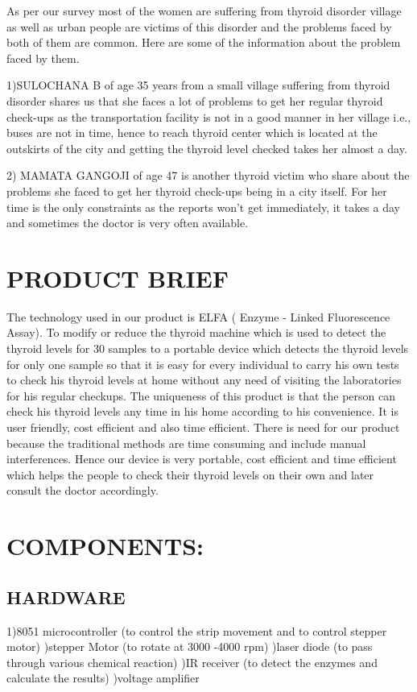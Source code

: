 \documentclass[a4paper,12pt]{article}
\begin{document}
    As per our survey most of the women are suffering from thyroid disorder 
    village as well as urban people are victims of this disorder and the problems faced by both of them are common. Here are some of the information about the problem faced by them.

     1)SULOCHANA B of age 35 years from a small village suffering from thyroid  disorder shares us that she faces a lot of problems to get her regular thyroid 
     check-ups as the transportation facility is not in a good manner in her
     village i.e., buses are not in time, hence to reach thyroid center which is located at the outskirts of the city and getting the thyroid level checked takes her almost a day.

     2) MAMATA GANGOJI of age 47 is another thyroid victim who share about the problems she faced to get her thyroid check-ups being in a city itself. For her time is the only constraints as the reports won’t get immediately, it takes a day and sometimes the doctor is very often available.
     
     \newpage
     \section{PRODUCT BRIEF}
     
    The technology used in our product is ELFA ( Enzyme - Linked Fluorescence Assay).
    To modify or reduce the thyroid machine which is used to detect the thyroid levels for 30 samples to a portable device which detects the thyroid levels for only one sample so that it is easy for every individual to carry his own tests to check his thyroid levels at home without any need of visiting the laboratories for his regular checkups.
    The uniqueness of this product is that the person can check his thyroid levels any time in his home according to his convenience. It is user friendly, cost efficient and also time efficient.
    There is need for our product because the traditional methods are time consuming and include manual interferences. Hence our device is very portable, cost efficient and time efficient which helps the people to check their thyroid levels on their own and later consult the doctor accordingly.
    
    
    \newpage
    \section{COMPONENTS:}
    \subsection{HARDWARE}
    1)8051 microcontroller (to control the strip movement and to control stepper motor)
    )stepper Motor (to rotate at 3000 -4000 rpm) 
    )laser diode (to pass through various chemical reaction)
    )IR receiver (to detect the enzymes and calculate the results)
    )voltage amplifier
    
\end{document}
